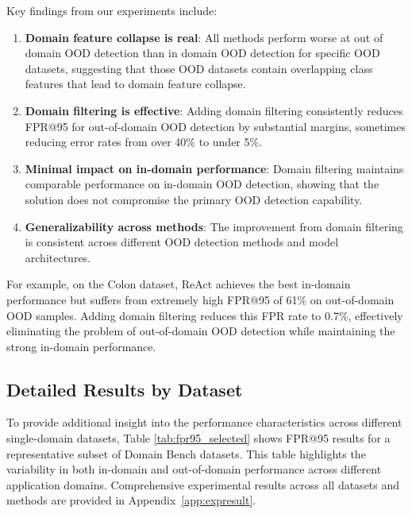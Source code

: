 \documentclass[11pt, oneside]{book}
\theoremstyle{plain}
\theoremstyle{definition}
\theoremstyle{remark}
\begin{document}
Key findings from our experiments include:

\begin{enumerate}
\item \textbf{Domain feature collapse is real}: All methods perform worse at out of domain OOD detection than in domain OOD detection for specific OOD datasets, suggesting that those OOD datasets contain overlapping class features that lead to domain feature collapse.

\item \textbf{Domain filtering is effective}: Adding domain filtering consistently reduces FPR@95 for out-of-domain OOD detection by substantial margins, sometimes reducing error rates from over 40\% to under 5\%.

\item \textbf{Minimal impact on in-domain performance}: Domain filtering maintains comparable performance on in-domain OOD detection, showing that the solution does not compromise the primary OOD detection capability.

\item \textbf{Generalizability across methods}: The improvement from domain filtering is consistent across different OOD detection methods and model architectures.
\end{enumerate}

For example, on the Colon dataset, ReAct achieves the best in-domain performance but suffers from extremely high FPR@95 of 61\% on out-of-domain OOD samples. Adding domain filtering reduces this FPR rate to 0.7\%, effectively eliminating the problem of out-of-domain OOD detection while maintaining the strong in-domain performance.

\subsection{Detailed Results by Dataset}

To provide additional insight into the performance characteristics across different single-domain datasets, Table \ref{tab:fpr95_selected} shows FPR@95 results for a representative subset of Domain Bench datasets. This table highlights the variability in both in-domain and out-of-domain performance across different application domains. Comprehensive experimental results across all datasets and methods are provided in Appendix~\ref{app:expresult}.
\end{document}

